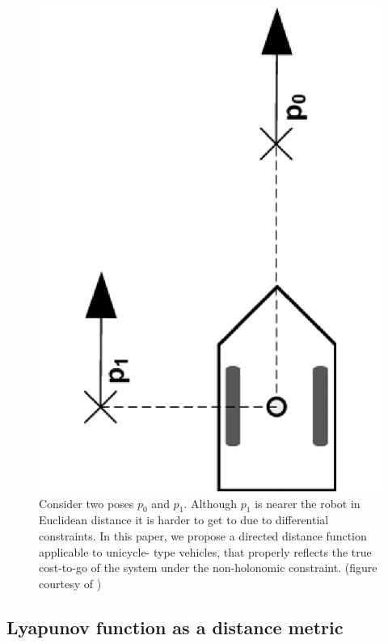 \begin{figure}
  \includegraphics[scale=.3,angle=-90]{figures/rrtfunnel/non-holonomic-vehicle-euclidean-weakness}
  \caption{Consider two poses \(p_0\) and \(p_1\). Although \(p_1\) is nearer
    the robot in Euclidean distance it is harder to get to due to differential
    constraints. In this paper, we propose a directed distance function
    applicable to unicycle- type vehicles, that properly reflects the true
    cost-to-go of the system under the non-holonomic constraint. (figure
    courtesy of \cite{parkFeedbackMotionPlanning2015})}
\end{figure}

\subsection{Lyapunov function as a distance metric}

